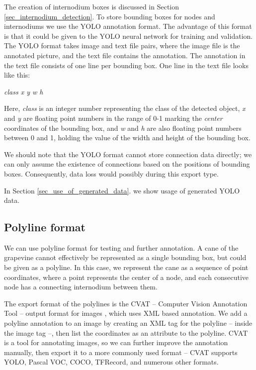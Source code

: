 \documentclass{PSAIE}%
\begin{document}
The creation of internodium boxes is discussed in Section \ref{sec_internodium_detection}. To store
bounding boxes for nodes and internodiums we use the YOLO annotation format. The advantage of this format
is that it could be given to the YOLO neural network for training and validation. The YOLO format takes image
and text file pairs, where the image file is the annotated picture, and the text file contains the annotation.
The annotation in the text file consists of one line per bounding box. One line in the text file looks like
this:

\textit{class x y w h}

Here, \textit{class} is an integer number representing the class of the detected object, \textit{x} and
\textit{y} are floating point numbers in the range of 0-1 marking the \textit{center} coordinates of the
bounding box, and \textit{w} and \textit{h} are also floating point numbers between 0 and 1, holding the
value of the width and height of the bounding box.

We should note that the YOLO format cannot store connection data directly; we can only assume the existence
of connections based on the positions of bounding boxes. Consequently, data loss would possibly during this
export type.

In Section \ref{sec_use_of_generated_data}. we show usage of generated YOLO data.

\subsection{Polyline format} \label{sec_export_polyline_format}
We can use polyline format for testing and further annotation. A cane of the grapevine cannot effectively
be represented as a single bounding box, but could be given as a polyline. In this case, we represent the cane
as a sequence of point coordinates, where a point represents the center of a node, and each consecutive
node has a connecting internodium between them.

The export format of the polylines is the CVAT -- Computer Vision Annotation Tool -- output format for
images \cite{boris_sekachev_2020_4009388}, which uses XML based annotation. We add a polyline annotation
to an image by creating an XML tag for the polyline -- inside the image tag --, then list the coordinates
as an attribute to the polyline. CVAT is a tool for annotating images, so we can further improve the
annotation manually, then export it to a more commonly used format -- CVAT supports YOLO, Pascal VOC, COCO,
TFRecord, and numerous other formats.
\end{document}
